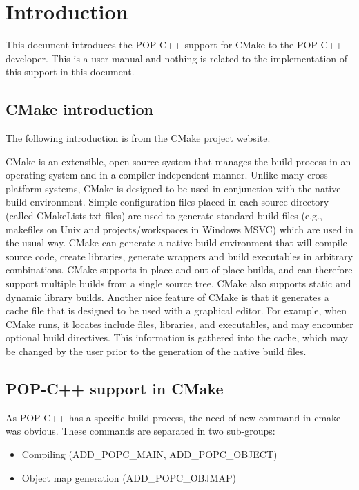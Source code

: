 \documentclass[a4paper, 11pt]{article}
\newcommand{\s}{\vspace{0.3cm}}
\begin{document}




\tableofcontents
\pagebreak
\section{Introduction}
This document introduces the POP-C++ support for CMake to the POP-C++ developer. This is a user manual and nothing is related to the implementation of this support in this document. 
\subsection{CMake introduction}
The following introduction is from the CMake project website\cite{cmake}.\s

CMake is an extensible, open-source system that manages the build process in an operating system and in a compiler-independent manner. Unlike many cross-platform systems, CMake is designed to be used in conjunction with the native build environment. Simple configuration files placed in each source directory (called CMakeLists.txt files) are used to generate standard build files (e.g., makefiles on Unix and projects/workspaces in Windows MSVC) which are used in the usual way. CMake can generate a native build environment that will compile source code, create libraries, generate wrappers and build executables in arbitrary combinations. CMake supports in-place and out-of-place builds, and can therefore support multiple builds from a single source tree. CMake also supports static and dynamic library builds. Another nice feature of CMake is that it generates a cache file that is designed to be used with a graphical editor. For example, when CMake runs, it locates include files, libraries, and executables, and may encounter optional build directives. This information is gathered into the cache, which may be changed by the user prior to the generation of the native build files.

\subsection{POP-C++ support in CMake}
As POP-C++ has a specific build process, the need of new command in cmake was obvious. These commands are separated in two sub-groups: 

\begin{itemize}
\item Compiling (ADD\_POPC\_MAIN, ADD\_POPC\_OBJECT)
\item Object map generation (ADD\_POPC\_OBJMAP)
\end{itemize}
\end{document}

